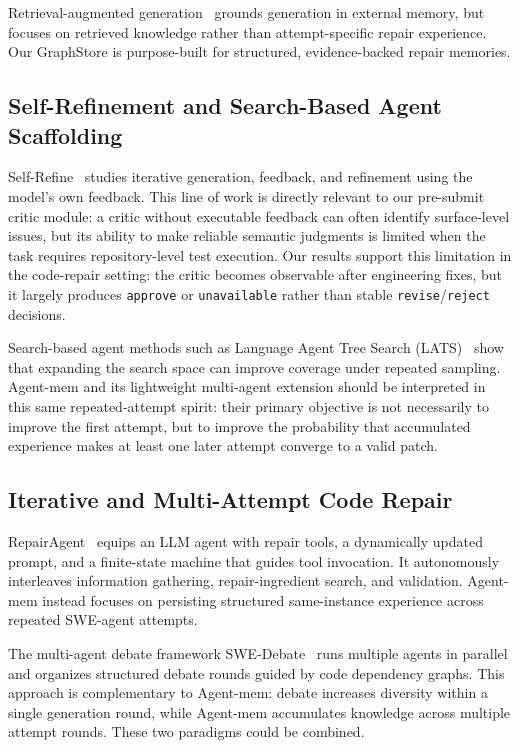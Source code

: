 \documentclass[runningheads]{llncs}
\begin{document}
Retrieval-augmented generation~\cite{lewis2020rag} grounds generation in external memory, but focuses on retrieved knowledge rather than attempt-specific repair experience. Our GraphStore is purpose-built for structured, evidence-backed repair memories.

\subsection{Self-Refinement and Search-Based Agent Scaffolding}

Self-Refine~\cite{madaan2023selfrefine} studies iterative generation, feedback, and refinement using the model's own feedback. This line of work is directly relevant to our pre-submit critic module: a critic without executable feedback can often identify surface-level issues, but its ability to make reliable semantic judgments is limited when the task requires repository-level test execution. Our results support this limitation in the code-repair setting: the critic becomes observable after engineering fixes, but it largely produces \texttt{approve} or \texttt{unavailable} rather than stable \texttt{revise}/\texttt{reject} decisions.

Search-based agent methods such as Language Agent Tree Search (LATS)~\cite{zhou2023lats} show that expanding the search space can improve coverage under repeated sampling. Agent-mem and its lightweight multi-agent extension should be interpreted in this same repeated-attempt spirit: their primary objective is not necessarily to improve the first attempt, but to improve the probability that accumulated experience makes at least one later attempt converge to a valid patch.

\subsection{Iterative and Multi-Attempt Code Repair}

RepairAgent~\cite{bouzenia2024repairagent} equips an LLM agent with repair tools, a dynamically updated prompt, and a finite-state machine that guides tool invocation. It autonomously interleaves information gathering, repair-ingredient search, and validation. Agent-mem instead focuses on persisting structured same-instance experience across repeated SWE-agent attempts.

The multi-agent debate framework SWE-Debate~\cite{li2025swedebate} runs multiple agents in parallel and organizes structured debate rounds guided by code dependency graphs. This approach is complementary to Agent-mem: debate increases diversity within a single generation round, while Agent-mem accumulates knowledge across multiple attempt rounds. These two paradigms could be combined.
\end{document}
